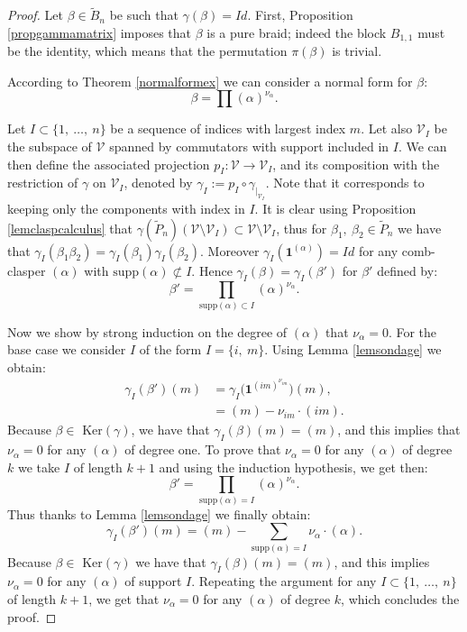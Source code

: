 \documentclass[11pt, a4paper, twoside,reqno]{amsart}
\newcommand\supp{\mathord{\mathrm{supp}}}
\begin{document}
\begin{proof}

Let $\beta\in\tilde B_n$ be such that $\gamma(\beta)=Id$. First, Proposition \ref{propgammamatrix} imposes that $\beta$ is a pure braid; indeed the block $B_{1,1}$ must be the identity, which means that the permutation $\pi(\beta)$ is trivial.

According to Theorem \ref{normalformex} we can consider a normal form for $\beta$:
$$\beta=\prod(\alpha)^{\nu_{\alpha}}.$$

Let $I\subset\{1,\ \ldots,\ n\}$ be a sequence of indices with largest index $m$. Let also $\mathcal{V}_I$ be the subspace of $\mathcal V$ spanned by commutators with support included in $I$. We can then define the associated projection $p_I:\mathcal V \to\mathcal V_I$, and its composition with the restriction of $\gamma$ on $\mathcal V_I$, denoted by $\gamma_I:=p_I\circ\gamma_{|_{\mathcal V_I}}$. Note that it corresponds to keeping only the components with index in $I$.
It is clear using Proposition \ref{lemclaspcalculus} that $\gamma(\tilde P_n)(\mathcal{V}\setminus\mathcal V_I)\subset\mathcal{V}\setminus\mathcal V_I$, thus for $\beta_1,\ \beta_2\in\tilde P_n$ we have that $\gamma_I(\beta_1\beta_2)=\gamma_I(\beta_1)\gamma_I(\beta_2)$. %
Moreover $\gamma_I(\mathbf1^{(\alpha)})=Id$ for any comb-clasper $(\alpha)$ with $\supp(\alpha)\not\subset I$. Hence $\gamma_I(\beta)=\gamma_I(\beta')$ for $\beta'$ defined by:
$$\beta'=\prod_{\supp(\alpha)\subset I}(\alpha)^{\nu_{\alpha}}.$$
 
Now we show by strong induction on the degree of $(\alpha)$ that $\nu_\alpha=0$. For the base case we consider $I$ of the form $I=\{i,\ m\}$. Using Lemma \ref{lemsondage} we obtain:
\begin{align*}
    \gamma_I(\beta')(m)&=\gamma_I\big(\mathbf1^{(im)^{\nu_{im}}}\big)(m),\\
                    &=(m)-\nu_{im}\cdot(im).
\end{align*}
Because $\beta\in$ Ker$(\gamma)$, we have that $\gamma_I(\beta)(m)=(m)$, and this implies that $\nu_{\alpha}=0$ for any $(\alpha)$ of degree one. To prove that $\nu_{\alpha}=0$ for any $(\alpha)$ of degree $k$ we take $I$ of length $k+1$ and using the induction hypothesis, we get then:
$$\beta'=\prod_{\supp(\alpha)= I}(\alpha)^{\nu_{\alpha}}.$$
Thus thanks to Lemma \ref{lemsondage} we finally obtain: 
$$\gamma_I(\beta')(m)=(m)-\sum_{\supp(\alpha)= I}\nu_\alpha\cdot(\alpha).$$
Because $\beta\in$ Ker$(\gamma)$ we have that $\gamma_I(\beta)(m)=(m)$, and this implies $\nu_{\alpha}=0$ for any $(\alpha)$ of support $I$. Repeating the argument for any $I\subset\{1,\ \ldots,\ n\}$ of length $k+1$, we get that $\nu_{\alpha}=0$ for any $(\alpha)$ of degree $k$, which concludes the proof.
\end{proof}
\end{document}
